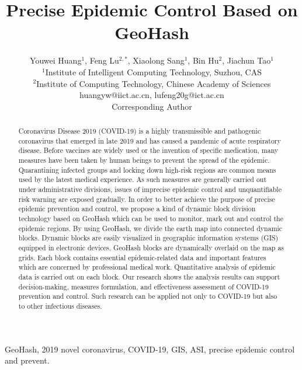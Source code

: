 \documentclass[conference]{IEEEtran}
\begin{document}
\title{Precise Epidemic Control Based on GeoHash}

\author{
    Youwei Huang$^{1}$, Feng Lu$^{2,*}$, Xiaolong Sang$^{1}$, Bin Hu$^{2}$, Jiachun Tao$^{1}$
    \\
    \normalsize $^{1}$Institute of Intelligent Computing Technology, Suzhou, CAS
    \\
    \normalsize $^{2}$Institute of Computing Technology, Chinese Academy of Sciences
    \\
    \normalsize huangyw@iict.ac.cn, lufeng20g@ict.ac.cn
    \\
    \normalsize *Corresponding Author
}

\maketitle

\begin{abstract}
    Coronavirus Disease 2019 (COVID-19) is a highly transmissible and pathogenic coronavirus that emerged in late 2019 and has caused a pandemic of acute respiratory disease.
    Before vaccines are widely used or the invention of specific medication, many measures have been taken by human beings to prevent the spread of the epidemic.
    Quarantining infected groups and locking down high-risk regions are common means used by the latest medical experience.
    As such measures are generally carried out under administrative divisions, issues of imprecise epidemic control and unquantifiable risk warning are exposed gradually.
    In order to better achieve the purpose of precise epidemic prevention and control, we propose a kind of dynamic block division technology based on GeoHash which can be used to monitor, mark out and control the epidemic regions.
    By using GeoHash, we divide the earth map into connected dynamic blocks.
    Dynamic blocks are easily visualized in geographic information systems (GIS) equipped in electronic devices.
    GeoHash blocks are dynamically overlaid on the map as grids.
    Each block contains essential epidemic-related data and important features which are concerned by professional medical work.
    Quantitative analysis of epidemic data is carried out on each block.
    Our research shows the analysis results can support decision-making, measures formulation, and effectiveness assessment of COVID-19 prevention and control.
    Such research can be applied not only to COVID-19 but also to other infectious diseases.
\end{abstract}
\IEEEoverridecommandlockouts
\begin{keywords}
    GeoHash, 2019 novel coronavirus, COVID-19, GIS, ASI, precise epidemic control and prevent.
\end{keywords}
\end{document}
